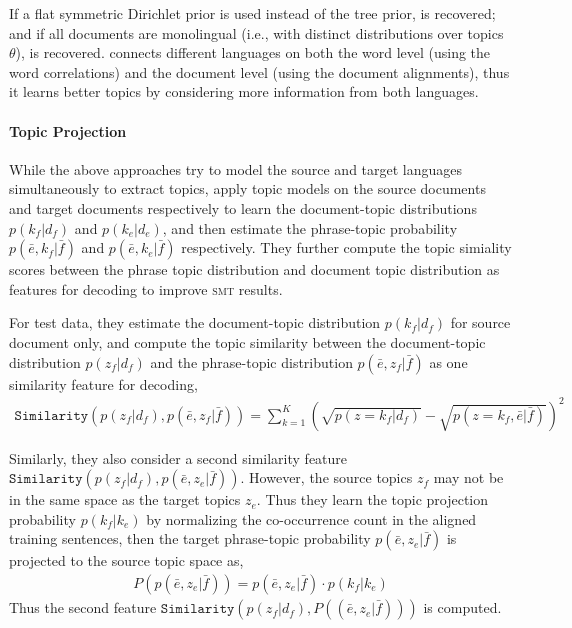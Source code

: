 If a flat symmetric Dirichlet prior is used instead of the tree prior,
\plda{} is recovered; and if all documents are monolingual (i.e., with
distinct distributions over topics $\theta$), \tlda{} is
recovered. \ptlda{} connects different languages on both the word
level (using the word correlations) and the document level (using the
document alignments), thus it learns better topics by considering more
information from both languages.

\paragraph{\bf Topic Projection}

While the above approaches try to model the source and target
languages simultaneously to extract topics, \citet{xiao-12} apply
topic models on the source documents and target documents respectively
to learn the document-topic distributions $p(k_f | d_f)$ and $p(k_e |
d_e)$, and then estimate the phrase-topic probability $p(\bar{e}, k_f
| \bar{f})$ and $p(\bar{e}, k_e | \bar{f})$ respectively. They further
compute the topic simiality scores between the phrase topic
distribution and document topic distribution as features for decoding
to improve \textsc{smt} results.

For test data, they estimate the document-topic distribution $p(k_f |
d_f)$ for source document only, and compute the topic similarity
between the document-topic distribution $p(z_f|d_f)$ and the
phrase-topic distribution $p(\bar{e}, z_f|\bar{f})$ as one similarity
feature for decoding,
\begin{align}
\texttt{Similarity}(p(z_f|d_f), p(\bar{e}, z_f|\bar{f})) = \sum_{k=1}^{K} (\sqrt{p(z=k_f|d_f)} - \sqrt{p(z=k_f, \bar{e}|\bar{f})})^2
\end{align}

Similarly, they also consider a second similarity feature
$\texttt{Similarity}(p(z_f|d_f), p(\bar{e}, z_e|\bar{f}))$. However,
the source topics $z_f$ may not be in the same space as the target
topics $z_e$. Thus they learn the topic projection probability $p(k_f
| k_e)$ by normalizing the co-occurrence count in the aligned training
sentences, then the target phrase-topic probability $p(\bar{e},
z_e|\bar{f})$ is projected to the source topic space as,
\begin{align}
P(p(\bar{e}, z_e|\bar{f})) = p(\bar{e}, z_e|\bar{f}) \cdot p(k_f | k_e)
\end{align}
Thus the second feature $\texttt{Similarity}(p(z_f|d_f), P((\bar{e},
z_e|\bar{f})))$ is computed.


